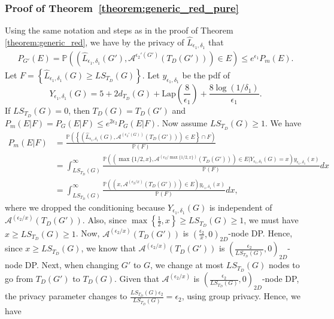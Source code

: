 \documentclass{article}
\begin{document}
\subsubsection{Proof of Theorem~\ref{theorem:generic_red_pure}}
\label{AppThemGenRedPure}

Using the same notation and steps as in the proof of Theorem \ref{theorem:generic_red}, we have by the privacy of $\hat{L}_{\epsilon_1, \delta_1}$ that
\begin{align*}
P_{G'}(E) = \mathbb{P}\left((\hat{L}_{\epsilon_1, \delta_1}(G'), \mathcal{A}^{\epsilon_2'(G')}(T_D(G'))) \in E\right) \leq e^{\epsilon_1}P_m(E). 
\end{align*}
Let $F = \left\{\hat{L}_{\epsilon_1, \delta_1}(G) \geq LS_{{T_D}}(G)\right\}$. Let $y_{\epsilon_1, \delta_1}$ be the pdf of
\begin{equation*}
Y_{\epsilon_1, \delta_1}(G) = 5 + 2 d_{T_D}(G) + \mathrm{Lap}\left(\frac{8}{\epsilon_1}\right) + \frac{8 \log(1/\delta_1)}{\epsilon_1}.
\end{equation*}
If $LS_{T_D}(G) = 0$, then $T_D(G) = T_D(G')$ and $P_m(E|F) = P_G(E|F) \leq e^{2\epsilon_2} P_G(E|F)$. Now assume $LS_{T_D}(G) \geq 1$. We have 
\begin{align*}
P_{m}(E|F) &= \frac{\mathbb{P}\left(\left\{(\hat{L}_{\epsilon_1, \delta_1}(G), \mathcal{A}^{\left(\epsilon_2'(G)\right)}(T_D(G')))\in E\right\} \cap F\right)}{\mathbb{P}(F)}\\
&= \int_{LS_{T_D}(G)}^{\infty}\frac{\mathbb{P}\left((\max\{1/2, x\}, \mathcal{A}^{(\epsilon_2/\max\{1/2, x\})}(T_D(G'))) \in E|Y_{\epsilon_1, \delta_1}(G) = x\right)y_{\epsilon_1, \delta_1}(x)}{\mathbb{P}(F)}dx\\
&= \int_{LS_{T_D}(G)}^{\infty}\frac{\mathbb{P}\left((x, \mathcal{A}^{(\epsilon_2/x)}(T_D(G'))) \in E\right)y_{\epsilon_1, \delta_1}(x)}{\mathbb{P}(F)}dx,     
\end{align*}
where we dropped the conditioning because $Y_{\epsilon_1, \delta_1}(G)$ is independent of $\mathcal{A}^{(\epsilon_2/x)}(T_D(G'))$. Also, since $\max\left\{\frac{1}{2}, x\right\} \geq LS_{T_D}(G) \geq 1$, we must have $x \geq LS_{T_D}(G) \geq 1$. Now, $\mathcal{A}^{(\epsilon_2/x)}(T_D(G'))$ is $\left(\frac{\epsilon_2}{x}, 0\right)_{2D}$-node DP. Hence, since $x \geq LS_{T_D}(G)$, we know that $\mathcal{A}^{(\epsilon_2/x)}(T_D(G'))$ is $\left(\frac{\epsilon_2}{LS_{T_D}(G)}, 0\right)_{2D}$-node DP. Next, when changing $G'$ to $G$, we change at most $LS_{T_D}(G)$ nodes to go from $T_D(G')$ to $T_D(G)$. Given that $\mathcal{A}^{(\epsilon_2/x)}$ is $\left(\frac{\epsilon_2}{LS_{T_D}(G)}, 0\right)_{2D}$-node DP, the privacy parameter changes to $\frac{LS_{T_D}(G)\epsilon_2}{LS_{T_D}(G)} = \epsilon_2$, using group privacy. Hence, we have
\end{document}
